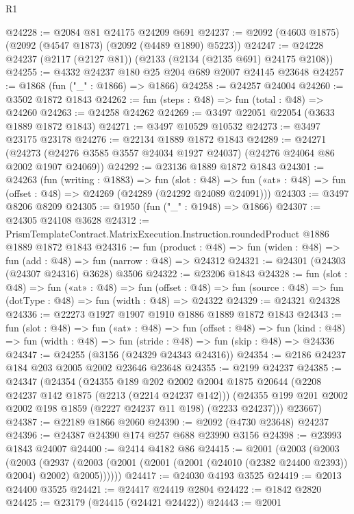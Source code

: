 \begin{lexlean}{R1}
\begin{coremodule}
@24228 := @2084 @81 @24175 @24209 @691
@24237 := @2092 (@4603 @1875) (@2092 (@4547 @1873) (@2092 (@4489 @1890) @5223))
@24247 := @24228 @24237 (@2117 (@2127 @81)) (@2133 (@2134 (@2135 @691) @24175 @2108))
@24255 := @4332 @24237 @180 @25 @204 @689 @2007 @24145 @23648
@24257 := @1868 (fun ("_" : @1866) => @1866)
@24258 := @24257 @24004
@24260 := @3502 @1872 @1843
@24262 := fun (steps : @48) => fun (total : @48) => @24260
@24263 := @24258 @24262
@24269 := @3497 @22051 @22054 (@3633 @1889 @1872 @1843)
@24271 := @3497 @10529 @10532
@24273 := @3497 @23175 @23178
@24276 := @22134 @1889 @1872 @1843
@24289 := @24271
    (@24273 (@24276 @3585 @3557 @24034 @1927 @24037) (@24276 @24064 @86 @2002 @1907 @24069))
@24292 := @23136 @1889 @1872 @1843
@24301 := @24263
    (fun (writing : @1883) =>
    fun (slot : @48) =>
    fun («at» : @48) => fun (offset : @48) => @24269 (@24289 (@24292 @24089 @24091)))
@24303 := @3497 @8206 @8209
@24305 := @1950 (fun ("_" : @1948) => @1866)
@24307 := @24305 @24108 @3628
@24312 := PrismTemplateContract.MatrixExecution.Instruction.roundedProduct @1886 @1889 @1872 @1843
@24316 := fun (product : @48) =>
  fun (widen : @48) => fun (add : @48) => fun (narrow : @48) => @24312
@24321 := @24301 (@24303 (@24307 @24316) @3628) @3506
@24322 := @23206 @1843
@24328 := fun (slot : @48) =>
  fun («at» : @48) =>
  fun (offset : @48) => fun (source : @48) => fun (dotType : @48) => fun (width : @48) => @24322
@24329 := @24321 @24328
@24336 := @22273 @1927 @1907 @1910 @1886 @1889 @1872 @1843
@24343 := fun (slot : @48) =>
  fun («at» : @48) =>
  fun (offset : @48) =>
  fun (kind : @48) => fun (width : @48) => fun (stride : @48) => fun (skip : @48) => @24336
@24347 := @24255 (@3156 (@24329 @24343 @24316))
@24354 := @2186 @24237 @184 @203 @2005 @2002 @23646 @23648
@24355 := @2199 @24237
@24385 := @24347
    (@24354
      (@24355
        @189
        @202
        @2002
        @2004
        @1875
        @20644
        (@2208 @24237 @142 @1875 (@2213 (@2214 @24237 @142)))
        (@24355 @199 @201 @2002 @2002 @198 @1859 (@2227 @24237 @11 @198) (@2233 @24237)))
      @23667)
@24387 := @22189 @1866 @2060
@24390 := @2092 (@4730 @23648) @24237
@24396 := @24387 @24390 @174 @257 @688 @23990 @3156
@24398 := @23993 @1843 @24007
@24400 := @2414 @4182 @86
@24415 := @2001
    (@2003
      (@2003
        (@2003
          (@2937 (@2003 (@2001 (@2001 (@2001 (@24010 (@2382 @24400 @2393)) @2004) @2002) @2005))))))
@24417 := @24030 @4193 @3525
@24419 := @2013 @24400 @3525
@24421 := @24417 @24419 @2804
@24422 := @1842 @2820
@24425 := @23179 (@24415 (@24421 @24422))
@24443 := @2001

\end{coremodule}
\end{lexlean}
